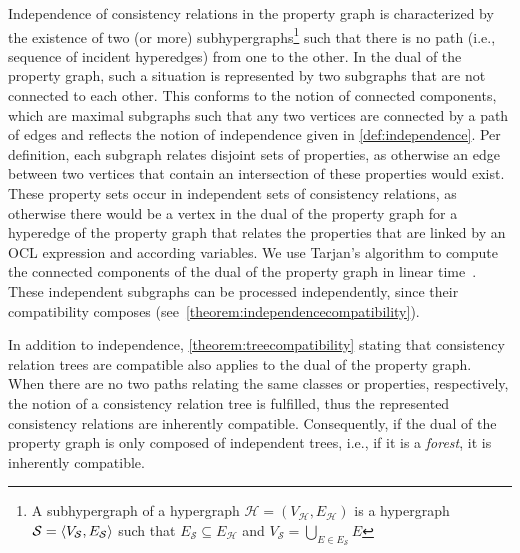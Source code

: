 Independence of consistency relations in the property graph is characterized by the existence of two (or more) subhypergraphs\footnote{A subhypergraph of a hypergraph $\mathcal{H} = (V_{\mathcal{H}}, E_{\mathcal{H}})$ is a hypergraph $\mathcal{S} = \langle V_{\mathcal{S}}, E_{\mathcal{S}} \rangle$ such that $E_{\mathcal{S}} \subseteq E_{\mathcal{H}}$ and $V_{\mathcal{S}} = \bigcup_{E \in E_{\mathcal{S}}} E$} such that there is no path (i.e., sequence of incident hyperedges) from one to the other.
In the dual of the property graph, such a situation is represented by two subgraphs that are not connected to each other.
This conforms to the notion of connected components, which are maximal subgraphs such that any two vertices are connected by a path of edges and reflects the notion of independence given in \autoref{def:independence}.
Per definition, each subgraph relates disjoint sets of properties, as otherwise an edge between two vertices that contain an intersection of these properties would exist.
These property sets occur in independent sets of consistency relations, as otherwise there would be a vertex in the dual of the property graph for a hyperedge of the property graph that relates the properties that are linked by an \gls{OCL} expression and according \qvtr variables.
We use Tarjan's algorithm to compute the connected components of the dual of the property graph in linear time~\cite{tarjan1972depth}.
These independent subgraphs can be processed independently, since their compatibility composes (see~\autoref{theorem:independencecompatibility}).

In addition to independence, \autoref{theorem:treecompatibility} stating that consistency relation trees are compatible also applies to the dual of the property graph.
When there are no two paths relating the same classes or properties, respectively, the notion of a consistency relation tree is fulfilled, thus the represented consistency relations are inherently compatible.
Consequently, if the dual of the property graph is only composed of independent trees, i.e., if it is a \emph{forest}, it is inherently compatible.

